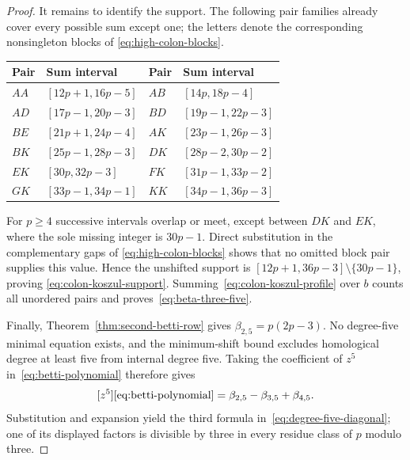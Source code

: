 \documentclass[11pt]{article}
\theoremstyle{definition}
\theoremstyle{remark}
\begin{document}
\begin{proof}
It remains to identify the support. The following pair families already cover every possible sum
except one; the letters denote the corresponding nonsingleton blocks of
\eqref{eq:high-colon-blocks}.
\begin{center}
\begin{tabular}{@{}llll@{}}
\toprule
Pair & Sum interval & Pair & Sum interval\\
\midrule
\(AA\) & \([12p+1,16p-5]\) & \(AB\) & \([14p,18p-4]\)\\
\(AD\) & \([17p-1,20p-3]\) & \(BD\) & \([19p-1,22p-3]\)\\
\(BE\) & \([21p+1,24p-4]\) & \(AK\) & \([23p-1,26p-3]\)\\
\(BK\) & \([25p-1,28p-3]\) & \(DK\) & \([28p-2,30p-2]\)\\
\(EK\) & \([30p,32p-3]\) & \(FK\) & \([31p-1,33p-2]\)\\
\(GK\) & \([33p-1,34p-1]\) & \(KK\) & \([34p-1,36p-3]\)\\
\bottomrule
\end{tabular}
\end{center}
For \(p\ge4\) successive intervals overlap or meet, except between \(DK\) and \(EK\), where the
sole missing integer is \(30p-1\). Direct substitution in the complementary gaps of
\eqref{eq:high-colon-blocks} shows that no omitted block pair supplies this value. Hence the
unshifted support is \([12p+1,36p-3]\setminus\{30p-1\}\), proving
\eqref{eq:colon-koszul-support}. Summing~\eqref{eq:colon-koszul-profile} over \(b\) counts all
unordered pairs and proves~\eqref{eq:beta-three-five}.

Finally, Theorem~\ref{thm:second-betti-row} gives \(\beta_{2,5}=p(2p-3)\). No degree-five minimal
equation exists, and the minimum-shift bound excludes homological degree at least five from
internal degree five. Taking the coefficient of \(z^5\) in~\eqref{eq:betti-polynomial} therefore
gives
\[
[z^5]\eqref{eq:betti-polynomial}=\beta_{2,5}-\beta_{3,5}+\beta_{4,5}.
\]
Substitution and expansion yield the third formula in~\eqref{eq:degree-five-diagonal}; one of its
displayed factors is divisible by three in every residue class of \(p\) modulo three.
\end{proof}
\end{document}

